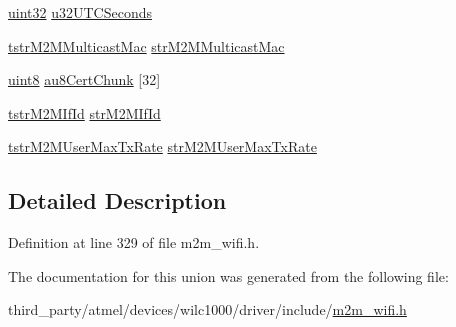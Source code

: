 \begin{DoxyCompactItemize}
\item 
\hyperlink{group__DataT_ga100e7c691a47d6978527c479a0158245}{uint32} \hyperlink{group__WifiSetCustInfoElementFn_ga1f606ddf58bcc3b277df02eba2bcddd0}{u32\+U\+T\+C\+Seconds}
\item 
\hyperlink{structtstrM2MMulticastMac}{tstr\+M2\+M\+Multicast\+Mac} \hyperlink{group__WifiSetCustInfoElementFn_ga324d83a2db53ecf43f9f1192bfb44b32}{str\+M2\+M\+Multicast\+Mac}
\item 
\hyperlink{group__DataT_ga4df709a77647e870bbf1d955b8edc9a6}{uint8} \hyperlink{group__WifiSetCustInfoElementFn_gade8c3edfe384c40d854409e4b77576e4}{au8\+Cert\+Chunk} \mbox{[}32\mbox{]}
\item 
\hyperlink{structtstrM2MIfId}{tstr\+M2\+M\+If\+Id} \hyperlink{group__WifiSetCustInfoElementFn_ga2e24fb5862f4b27ee61f92a5376ee298}{str\+M2\+M\+If\+Id}
\item 
\hyperlink{structtstrM2MUserMaxTxRate}{tstr\+M2\+M\+User\+Max\+Tx\+Rate} \hyperlink{group__WifiSetCustInfoElementFn_gab96ecff463075c0ed919fa6005eed011}{str\+M2\+M\+User\+Max\+Tx\+Rate}
\end{DoxyCompactItemize}


\subsection{Detailed Description}


Definition at line 329 of file m2m\+\_\+wifi.\+h.



The documentation for this union was generated from the following file\+:\begin{DoxyCompactItemize}
\item 
third\+\_\+party/atmel/devices/wilc1000/driver/include/\hyperlink{m2m__wifi_8h}{m2m\+\_\+wifi.\+h}\end{DoxyCompactItemize}
